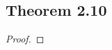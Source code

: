 \documentclass[../../main.tex]{subfiles}
\begin{document}
\subsection{Theorem 2.10}
\begin{wts}

\end{wts}
\begin{proof}

\end{proof}
\end{document}
